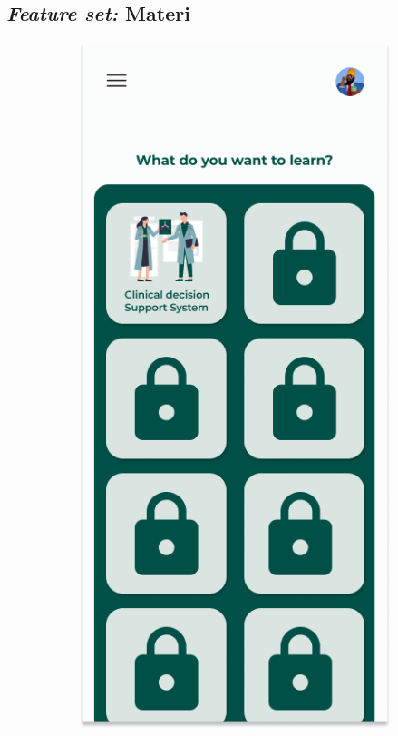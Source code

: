 \subsection{\textit{Feature set:} Materi}
\begin{figure}[H]
	\centering
	\begin{subfigure}[b]{0.23\textwidth}
		\centering
	  \includegraphics[width=\linewidth]{contents/chapter-3/images/HF-materi.png}

\end{subfigure}
\end{figure}
